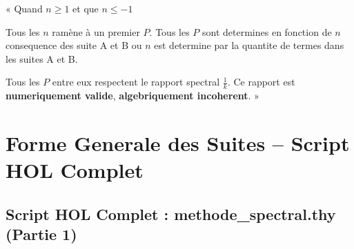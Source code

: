 \documentclass[a4paper,11pt]{article}
\begin{document}
\begin{tcolorbox}[colback=blue!5,colframe=holblue,title={\textbf{Axiomatisation du Rapport Spectral}}]
« Quand $n \geq 1$ et que $n \leq -1$

Tous les $n$ ramène à un premier $P$. Tous les $P$ sont determines en fonction de $n$ consequence des suite A et B ou $n$ est determine par la quantite de termes dans les suites A et B.

Tous les $P$ entre eux respectent le rapport spectral $\frac{1}{k}$. Ce rapport est \textbf{numeriquement valide}, \textbf{algebriquement incoherent}. »
\end{tcolorbox}

\newpage
\section{Forme Generale des Suites -- Script HOL Complet}

\subsection{Script HOL Complet : methode\_spectral.thy (Partie 1)}
\end{document}
